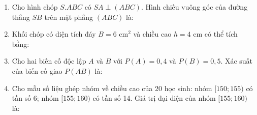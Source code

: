 \documentclass[12pt, a4paper]{article}
\begin{document}
\begin{tcolorbox}[enhanced, colback=white, colframe=blue!70!black, arc=1.5mm, title=\textbf{TRƯỜNG THCS\&THPT HỒNG VÂN -- ĐỀ KIỂM TRA CUỐI NĂM TOÁN 11 (MÃ ĐỀ 101)}]
\begin{enumerate}[label=\textbf{Câu \arabic*.}]
    \item Cho hình chóp $S.ABC$ có $SA \perp (ABC)$. Hình chiếu vuông góc của đường thẳng $SB$ trên mặt phẳng $(ABC)$ là:

    \item Khối chóp có diện tích đáy $B = 6\text{ cm}^2$ và chiều cao $h = 4\text{ cm}$ có thể tích bằng:

    \item Cho hai biến cố độc lập $A$ và $B$ với $P(A) = 0{,}4$ và $P(B) = 0{,}5$. Xác suất của biến cố giao $P(AB)$ là:

    \item Cho mẫu số liệu ghép nhóm về chiều cao của 20 học sinh: nhóm $[150; 155)$ có tần số 6; nhóm $[155; 160)$ có tần số 14. Giá trị đại diện của nhóm $[155; 160)$ là:
\end{enumerate}


\end{tcolorbox}
\end{document}
